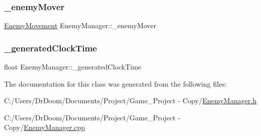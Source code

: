 \mbox{\label{class_enemy_manager_ade1b38d513c67ab3d461639c1d7c7bad}} 
\subsubsection{\texorpdfstring{\+\_\+enemy\+Mover}{\_enemyMover}}
{\footnotesize\ttfamily \hyperlink{class_enemy_movement}{Enemy\+Movement} Enemy\+Manager\+::\+\_\+enemy\+Mover\hspace{0.3cm}{\ttfamily [private]}}

\mbox{\label{class_enemy_manager_acc7728a6a32d399ca416558f7b769090}} 
\subsubsection{\texorpdfstring{\+\_\+generated\+Clock\+Time}{\_generatedClockTime}}
{\footnotesize\ttfamily float Enemy\+Manager\+::\+\_\+generated\+Clock\+Time\hspace{0.3cm}{\ttfamily [private]}}



The documentation for this class was generated from the following files\+:\begin{DoxyCompactItemize}
\item 
C\+:/\+Users/\+Dr\+Doom/\+Documents/\+Project/\+Game\+\_\+\+Project -\/ Copy/\hyperlink{_enemy_manager_8h}{Enemy\+Manager.\+h}\item 
C\+:/\+Users/\+Dr\+Doom/\+Documents/\+Project/\+Game\+\_\+\+Project -\/ Copy/\hyperlink{_enemy_manager_8cpp}{Enemy\+Manager.\+cpp}\end{DoxyCompactItemize}
